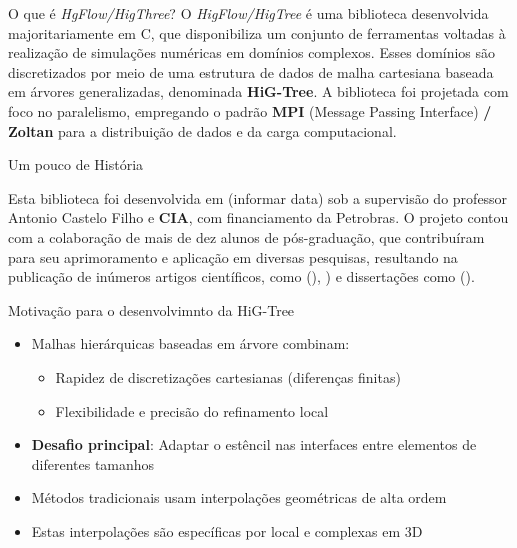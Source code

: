 \documentclass[aspectratio=169,t,xcolor=table]{beamer}
\begin{document}
\begin{frame}{}
	\smaller
	\begin{block}{O que é \textit{HgFlow/HigThree}?}
		\vspace{0.25 cm}
    O \textit{HigFlow/HigTree} é uma biblioteca desenvolvida majoritariamente
    em C, que disponibiliza um conjunto de ferramentas voltadas à realização de
    simulações numéricas em domínios complexos. Esses domínios são
    discretizados por meio de uma estrutura de dados de malha cartesiana
    baseada em árvores generalizadas, denominada \textbf{HiG-Tree}. A
    biblioteca foi projetada com foco no paralelismo, empregando o padrão
    \textbf{MPI} (Message Passing Interface)\textbf{ / Zoltan} para a
    distribuição de dados e da carga computacional.
	\end{block}
	
	\begin{block}{Um pouco de História}
		\vspace{0.25 cm}
		
    Esta biblioteca foi desenvolvida em (informar data) sob a supervisão do
    professor Antonio Castelo Filho e \textbf{CIA}, com financiamento da
    Petrobras. O projeto contou com a colaboração de mais de dez alunos de
    pós-graduação, que contribuíram para seu aprimoramento e aplicação em
    diversas pesquisas, resultando na publicação de inúmeros artigos
    científicos, como  (),
    ) e dissertações como
    ().
	\end{block}
\end{frame}


\begin{frame}{}
  \begin{block}{Motivação para o desenvolvimnto da HiG-Tree}
    \begin{itemize}
      \item Malhas hierárquicas baseadas em árvore combinam:
        \begin{itemize}
          \item Rapidez de discretizações cartesianas (diferenças finitas)
          \item Flexibilidade e precisão do refinamento local
        \end{itemize}
      \item \textbf{Desafio principal}: Adaptar o estêncil nas interfaces entre elementos de diferentes tamanhos
      \item Métodos tradicionais usam interpolações geométricas de alta ordem
      \item Estas interpolações são específicas por local e complexas em 3D
    \end{itemize}
  \end{block}
    \end{frame}
\end{document}
